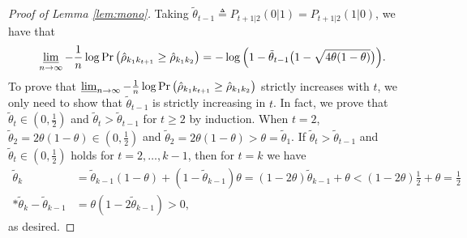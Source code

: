 \documentclass[11pt,onecolumn]{article}
\newcommand{\ttheta}{\tilde{\theta}}
\newcommand{\hrho}{\hat{\rho}}
\begin{document}
\begin{proof}[Proof of Lemma \ref{lem:mono}]
	Taking $\ttheta_{t-1}\triangleq P_{t+1|2}(0|1)=P_{t+1|2}(1|0)$, we have that
	\begin{align}
		\varliminf_{n\rightarrow \infty}-\frac{1}{n}\log\Pr\big(\hrho_{k_{1}k_{t+1}}\geq \hrho_{k_{1}k_{2}}\big)=-\log\Big(1-\ttheta_{t-1}\big(1-\sqrt{4\theta(1-\theta)}\big)\Big).
	\end{align}
	To prove that $\varliminf_{n\rightarrow \infty}-\frac{1}{n}\log \Pr\big(\hrho_{k_{1}k_{t+1}}\geq \hrho_{k_{1}k_{2}}\big)$ strictly increases with   $t$, we only need to show that 
	$\ttheta_{t-1}$ is strictly increasing in $t$. In fact, we prove that $\ttheta_{t}\in(0,\frac{1}{2})$ and $\ttheta_{t}>\ttheta_{t-1}$ for $t\geq 2$ by induction. When 
	$t=2$, $\ttheta_{2}=2\theta(1-\theta)\in (0,\frac{1}{2})$ and $\ttheta_{2}=2\theta(1-\theta)>\theta=\ttheta_{1}$. If $\ttheta_{t}>\ttheta_{t-1}$ and $\ttheta_{t}\in(0,\frac{1}{2})$ holds 
	for $t=2,\ldots,k-1$, then for $t=k$ we have
	\begin{align}
		\ttheta_{k}&=\ttheta_{k-1}(1-\theta)+(1-\ttheta_{k-1})\theta=(1-2\theta)\ttheta_{k-1}+\theta<(1-2\theta)\frac{1}{2}+\theta=\frac{1}{2}\\*
		\ttheta_{k}-\ttheta_{k-1}&=\theta(1-2\ttheta_{k-1})>0,
	\end{align}
	as desired.
\end{proof}
\end{document}
